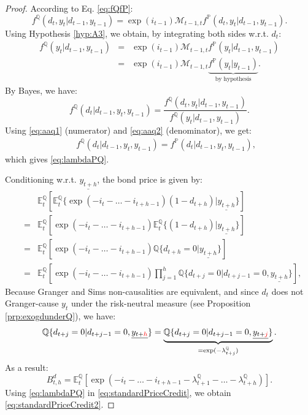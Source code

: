 \documentclass[
  12pt,
]{book}
\theoremstyle{definition}
\theoremstyle{definition}
\theoremstyle{definition}
\theoremstyle{definition}
\theoremstyle{remark}
\begin{document}
\begin{proof}
According to Eq. \eqref{eq:fQfP}:
\begin{equation}
f^{\mathbb{Q}}(d_t,y_t|d_{t-1},y_{t-1}) = \exp(i_{t-1})\mathcal{M}_{t-1,t} f^{\mathbb{P}}(d_t,y_t|d_{t-1},y_{t-1}).\label{eq:aaq1}
\end{equation}
Using Hypothesis \ref{hyp:A3}, we obtain, by integrating both sides w.r.t. \(d_t\):
\begin{eqnarray}
f^{\mathbb{Q}}(y_t|d_{t-1},y_{t-1}) &=& \exp(i_{t-1})\mathcal{M}_{t-1,t} f^{\mathbb{P}}(y_t|d_{t-1},y_{t-1})\nonumber\\
&=& \exp(i_{t-1})\mathcal{M}_{t-1,t} \underbrace{f^{\mathbb{P}}(y_t|y_{t-1})}_{\mbox{by hypothesis}}. \label{eq:aaq2}
\end{eqnarray}
By Bayes, we have:
\[
f^{\mathbb{Q}}(d_t|d_{t-1},y_t,y_{t-1}) = \frac{f^{\mathbb{Q}}(d_t,y_t|d_{t-1},y_{t-1})}{f^{\mathbb{Q}}(y_t|d_{t-1},y_{t-1})}.
\]
Using \eqref{eq:aaq1} (numerator) and \eqref{eq:aaq2} (denominator), we get:
\begin{eqnarray*}
&& f^{\mathbb{Q}}(d_t|d_{t-1},y_t,y_{t-1}) = f^{\mathbb{P}}(d_t|d_{t-1},y_t,y_{t-1}),
\end{eqnarray*}
which gives \eqref{eq:lambdaPQ}.

Conditioning w.r.t. \(\underline{y_{t+h}}\), the bond price is given by:
\begin{eqnarray*}
&& \mathbb{E}_t^{\mathbb{Q}}[\mathbb{E}_t^{\mathbb{Q}}\{\exp(-i_t-\dots-i_{t+h-1})(1-d_{t+h})|\underline{y_{t+h}}\}]\\
&=& \mathbb{E}_t^{\mathbb{Q}}[\exp(-i_t-\dots-i_{t+h-1})\mathbb{E}_t^{\mathbb{Q}}\{(1-d_{t+h})|\underline{y_{t+h}}\}]\\
&=& \mathbb{E}_t^{\mathbb{Q}}[\exp(-i_t-\dots-i_{t+h-1})\mathbb{Q}\{d_{t+h}=0|\underline{y_{t+h}}\}]\\
&=& \mathbb{E}_t^{\mathbb{Q}}\left[\exp(-i_t-\dots-i_{t+h-1})\prod_{j=1}^h\mathbb{Q}\{d_{t+j}=0|d_{t+j-1}=0,\underline{y_{t+h}}\}\right],
\end{eqnarray*}
Because Granger and Sims non-causalities are equivalent, and since \(d_t\) does not Granger-cause \(y_t\) under the risk-neutral measure (see Proposition \ref{prp:exogdunderQ}), we have:
\[
\mathbb{Q}\{d_{t+j}=0|d_{t+j-1}=0,\underline{y_{t+{\color{red}h}}}\} = \underbrace{\mathbb{Q}\{d_{t+j}=0|d_{t+j-1}=0,\underline{y_{t+{\color{red}j}}}\}}_{=\exp(-\lambda_{t+j}^{\mathbb{Q}})}.
\]
As a result:
\begin{equation}
B_{t,h}^d = \mathbb{E}_t^{\mathbb{Q}}\left[\exp\left(-i_t-\dots-i_{t+h-1}- \lambda_{t+1}^{\mathbb{Q}} - \dots - \lambda_{t+h}^{\mathbb{Q}}\right)\right].\label{eq:standardPriceCredit}
\end{equation}
Using \eqref{eq:lambdaPQ} in \eqref{eq:standardPriceCredit}, we obtain \eqref{eq:standardPriceCredit2}.
\end{proof}
\end{document}
